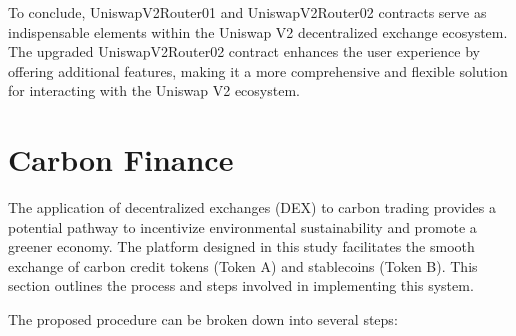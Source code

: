 \documentclass[sigconf, authordraft]{acmart}
\begin{document}
	To conclude, UniswapV2Router01 and UniswapV2Router02 contracts serve as indispensable
	elements within the Uniswap V2 decentralized exchange ecosystem. The upgraded
	UniswapV2Router02 contract enhances the user experience by offering additional
	features, making it a more comprehensive and flexible solution for interacting
	with the Uniswap V2 ecosystem.

	\section{Carbon Finance}


	The application of decentralized exchanges (DEX) to carbon trading provides a potential
	pathway to incentivize environmental sustainability and promote a greener economy.
	The platform designed in this study facilitates the smooth exchange of carbon
	credit tokens (Token A) and stablecoins (Token B). This section outlines the process
	and steps involved in implementing this system.

	The proposed procedure can be broken down into several steps:
\end{document}
